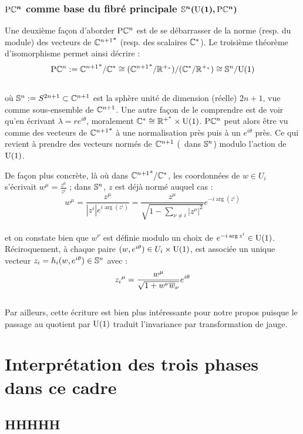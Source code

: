 \subsubsection{$\bf{\PC{n}}$ comme base du fibré principale $\bf{\S{n}(\U{1},\PC{n})}$}


Une deuxième façon d'aborder $\PC{n}$ est de se débarrasser de la norme (resp. du module) des vecteurs de ${\C^{n+1}}^*$ (resp. des scalaires $\C^*$). Le troisième théorème d'isomorphisme permet ainsi décrire :
\[\PC{n} \defeq {\C^{n+1}}^*/\C^* \cong ({\C^{n+1}}^* / \R^{+_*})/(\C^* / \R^{+_*}) \cong \S{n}/\U{1}\]
\\
où $\S{n}\defeq S^{2n+1}\subset\C^{n+1}$ est la sphère unité de dimension (réelle) $2n+1$, vue comme sous-ensemble de $\C^{n+1}$. Une autre façon de le comprendre est de voir qu'en écrivant $\lambda=re^{i\theta}$, moralement $\C^*\cong \R^{+^*}\times \U{1}$. $\PC{n}$ peut alors être vu comme des vecteurs de ${\C^{n+1}}^*$ à une normalisation près puis à un $e^{i\theta}$ près. Ce qui revient à prendre des vecteurs normés de $\C^{n+1}$ (\ie~dans $\S{n}$) modulo l'action de $\U{1}$.

De façon plus concrète, là où dans ${\C^{n+1}}^*/\C^*$, les coordonnées de $w\in U_i$ s'écrivait $w^\mu = \frac{z^\mu}{z^i}$ ; dans $\S{n}$, $z$ est déjà normé auquel cas :
\[w^\mu = \frac{z^\mu}{|z^i|e^{i\arg (z^i)}} = \frac{z^{\mu}}{\sqrt{1-\sum_{\nu\neq i}|z^\nu|^2}}e^{-i\arg(z^i)}\]
\\
et on constate bien que $w^\nu$ est définie modulo un choix de $e^{-i\arg z^i}\in \U{1}$. Réciroquement, à chaque paire $(w,e^{i\theta})\in U_i\times \U{1}$, est associée un unique vecteur $z_i = h_i(w,e^{i\theta})\in\S{n}$ avec :
\[{z_i}^\mu = \frac{w^\mu}{\sqrt{1 + w^\nu \congu{w}_\nu}}e^{i\theta}\]
\\

Par ailleurs, cette écriture est bien plus intéressante pour notre propos puisque le passage au quotient par $\U{1}$ traduit l'invariance par transformation de jauge.






\section{Interprétation des trois phases dans ce cadre}

\subsection{HHHHH}

